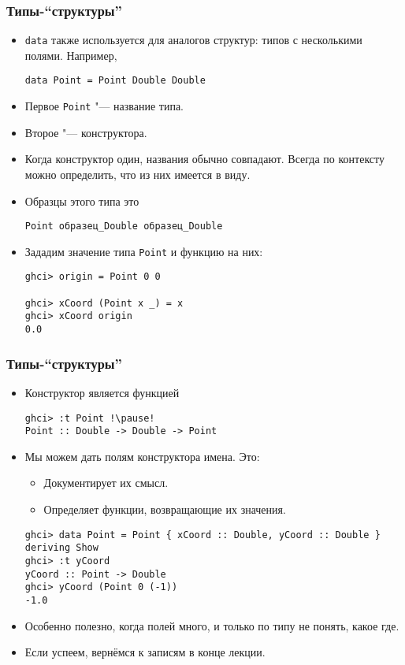 \documentclass[10pt]{beamer}
\begin{document}
\begin{frame}[fragile]
  \frametitle{Типы-\enquote{структуры}}
  \begin{itemize}
    \item \lstinline|data| также используется для аналогов структур: типов с несколькими полями. Например,
          \begin{lstlisting}[basicstyle=\ttfamily\footnotesize]
data Point = Point Double Double
\end{lstlisting}
    \item Первое \lstinline|Point| "--- название типа.
    \item Второе "--- конструктора.
    \item Когда конструктор один, названия обычно совпадают. Всегда по контексту можно определить, что из них имеется в виду.
    \item Образцы этого типа \pause это\\
          \begin{lstlisting}[basicstyle=\ttfamily\footnotesize]
Point образец_Double образец_Double
\end{lstlisting}
    \item Зададим значение типа \lstinline|Point| и функцию на них:
          \begin{lstlisting}[basicstyle=\ttfamily\footnotesize]
ghci> origin = Point 0 0

ghci> xCoord (Point x _) = x
ghci> xCoord origin
0.0
\end{lstlisting}
  \end{itemize}
\end{frame}

\begin{frame}[fragile]
  \frametitle{Типы-\enquote{структуры}}
  \begin{itemize}
    \item Конструктор является функцией
          \begin{lstlisting}
ghci> :t Point !\pause!
Point :: Double -> Double -> Point
\end{lstlisting}
    \item Мы можем дать полям конструктора имена. Это:\hypertarget{rec1}{}
          \begin{itemize}
            \item Документирует их смысл.
            \item Определяет функции, возвращающие их значения.
          \end{itemize}
          \begin{lstlisting}
ghci> data Point = Point { xCoord :: Double, yCoord :: Double } deriving Show
ghci> :t yCoord
yCoord :: Point -> Double
ghci> yCoord (Point 0 (-1))
-1.0
\end{lstlisting}
    \item Особенно полезно, когда полей много, и только по типу не понять, какое где.
    \item Если успеем, вернёмся к записям в конце лекции. \hyperlink{rec2}{}
  \end{itemize}
\end{frame}
\end{document}
